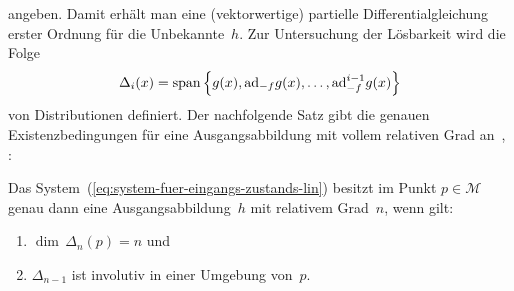 angeben. Damit erhält man eine (vektorwertige) partielle Differentialgleichung
erster Ordnung für die Unbekannte~$h$. Zur Untersuchung der Lösbarkeit
wird die Folge 
\begin{equation}
\Delta_{i}(x)={\operatorname{span}}\left\{ g(x),{\operatorname{ad}}_{-f}g(x),\ldots,{\operatorname{ad}}_{-f}^{i-1}g(x)\right\} \label{eq:Distributionen-Delta-i}
\end{equation}
von Distributionen definiert. Der nachfolgende
Satz gibt die genauen Existenzbedingungen für eine Ausgangsabbildung
mit vollem relativen Grad an~\cite{su1982}, \cite[Theorem~{4.2.3}]{isidori3}:
\begin{theorem}
\label{thm:Exakte-Eingangs-Zustands_Linearisierung}Das System~(\ref{eq:system-fuer-eingangs-zustands-lin})
besitzt im Punkt $p\in\mathcal{M}$ genau dann eine Ausgangsabbildung~$h$
mit relativem Grad~$n$, wenn gilt:
\begin{enumerate}
\item \label{enu:exakt-dim}$\dim\,\Delta_{n}(p)=n$ und
\item \label{enu:exakt-involutiv}$\Delta_{n-1}$ ist involutiv in einer
Umgebung von~$p$.
\end{enumerate}
\end{theorem}

